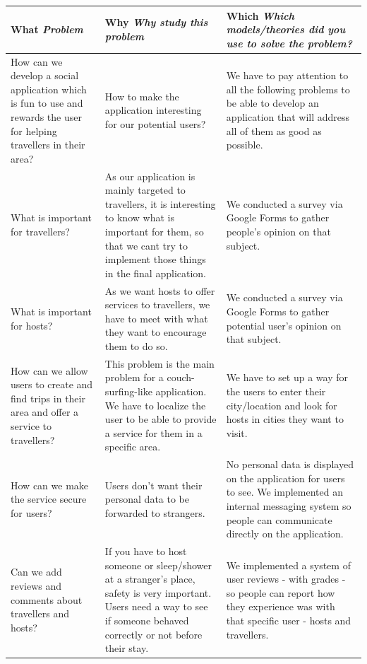 \documentclass[paper=a4, fontsize=12pt,DIV=14]{scrartcl}    %
\begin{document}
	        \begin{tabular}{|p{5cm}|p{5cm}|p{5.1cm}|}
	            \hline
                \textbf{What} \newline \textit{Problem} & \textbf{Why} \newline \textit{Why study this problem} & \textbf{Which} \newline \textit{Which models/theories did you use to solve the problem?}\\
                \hline
                \hline
                How can we develop a social application which is fun to use and rewards the user for helping travellers in their area? 
                & How to make the application interesting for our potential users?
                & We have to pay attention to all the following problems to be able to develop an application that will address all of them as good as possible.\\
                \hline
                What is important for travellers?
                & As our application is mainly targeted to travellers, it is interesting to know what is important for them, so that we cant try to implement those things in the final application.
                & We conducted a survey via Google Forms to gather people's opinion on that subject.\\
                \hline
                What is important for hosts?
                & As we want hosts to offer services to travellers, we have to meet with what they want to encourage them to do so.
                & We conducted a survey via Google Forms to gather potential user's opinion on that subject.\\
                \hline
                How can we allow users to create and find trips in their area and offer a service to travellers?
                & This problem is the main problem for a couch-surfing-like application. We have to localize the user to be able to provide a service for them in a specific area.
                & We have to set up a way for the users to enter their city/location and look for hosts in cities they want to visit.\\
                \hline
                How can we make the service secure for users?
                & Users don't want their personal data to be forwarded to strangers.
                & No personal data is displayed on the application for users to see. We implemented an internal messaging system so people can communicate directly on the application.\\
                \hline
                Can we add reviews and comments about travellers and hosts?
                & If you have to host someone or sleep/shower at a stranger's place, safety is very important. Users need a way to see if someone behaved correctly or not before their stay.
                & We implemented a system of user reviews - with grades - so people can report how they experience was with that specific user - hosts and travellers.\\
                \hline
            \end{tabular}
\end{document}
